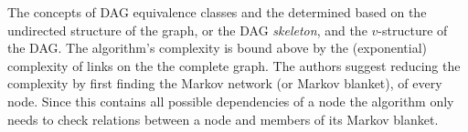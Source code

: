 


    The concepts of DAG equivalence classes and the 
    determined based on the undirected structure of the
    graph, or the DAG  \textit{skeleton}, and the $v$-structure of
    the DAG. The algorithm's complexity is bound 
    above by the (exponential)
    complexity of links on the the complete graph.   
    The authors suggest reducing
    the complexity by first finding the Markov
    network (or Markov blanket), of every node. Since
    this contains all possible dependencies of a 
    node the algorithm only needs to check 
    relations between a node and members of its
    Markov blanket. 

